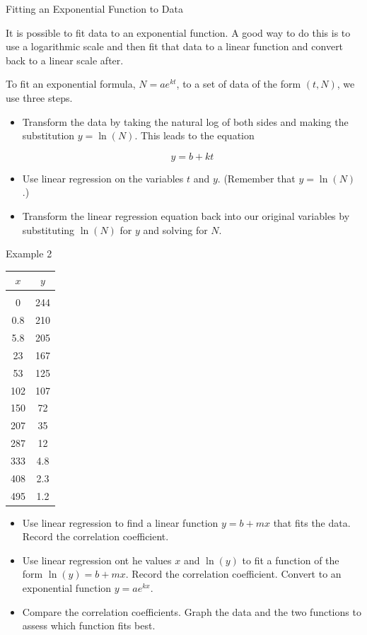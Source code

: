\documentclass[ignorenonframetext,]{beamer}
\providecommand{\tightlist}{%
  \setlength{\itemsep}{0pt}\setlength{\parskip}{0pt}}
\begin{document}
\begin{frame}{Fitting an Exponential Function to Data}

It is possible to fit data to an exponential function. A good way to do
this is to use a logarithmic scale and then fit that data to a linear
function and convert back to a linear scale after.

To fit an exponential formula, \(N = ae^{kt}\), to a set of data of the
form \((t, N)\), we use three steps.

\begin{itemize}
\item
  Transform the data by taking the natural log of both sides and making
  the substitution \(y = \ln(N)\). This leads to the equation

$$y = b + kt$$

\item
  Use linear regression on the variables \(t\) and \(y\). (Remember that
  \(y = \ln(N)\).)
\item
  Transform the linear regression equation back into our original
  variables by substituting \(\ln(N)\) for \(y\) and solving for \(N\).
\end{itemize}

\end{frame}

\begin{frame}{Example 2}
\begin{minipage}{0.49\textwidth}
\begin{tabular}{c|c}
\hline
$x$ & $y$ \\ \hline \\
0 & 244 \\
0.8 & 210 \\
5.8 & 205 \\
23 & 167 \\
53 & 125 \\
102 & 107 \\
150 & 72 \\
207 & 35 \\
287 & 12 \\
333 & 4.8 \\
408 & 2.3 \\
495 & 1.2
\end{tabular}
\end{minipage}%
\begin{minipage}{0.49\textwidth}
\begin{itemize}
\tightlist
\item
  Use linear regression to find a linear function \(y = b + mx\) that
  fits the data. Record the correlation coefficient.
\item
  Use linear regression ont he values \(x\) and \(\ln(y)\) to fit a
  function of the form \(\ln(y) = b + mx\). Record the correlation
  coefficient. Convert to an exponential function \(y = ae^{kx}\).
\item
  Compare the correlation coefficients. Graph the data and the two
  functions to assess which function fits best.
\end{itemize}
\end{minipage}
\end{frame}
\end{document}
